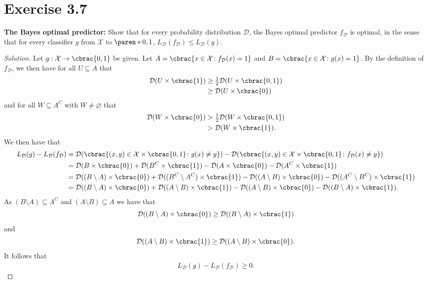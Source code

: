 \documentclass[10pt, a4paper, twoside]{amsart}
\DeclarePairedDelimiter\cbrac\{\}
\DeclarePairedDelimiter\paren()
\renewcommand{\c}{\ensuremath{\colon}}
\newcommand{\se}{\ensuremath{\subseteq}}
\newenvironment{solution}
               {\let\oldqedsymbol=\qedsymbol
                \renewcommand{\qedsymbol}{$\blacktriangleleft$}
                \begin{proof}[Solution]}
               {\end{proof}
                \renewcommand{\qedsymbol}{\oldqedsymbol}}
\begin{document}
\section*{Exercise 3.7}
\textbf{The Bayes optimal predictor:} Show that for every probability distribution $\mathcal{D}$, the Bayes optimal predictor $f_{\mathcal{D}}$ is optimal, in the sense that for every classifier $g$ from $\mathcal{X}$ to $\paren*{0,1}$, $L_{\mathcal{D}}(f_{\mathcal{D}}) \leq L_{\mathcal{D}}(g)$.
\begin{solution}
Let $g:\mathcal{X} \to \cbrac{0,1}$ be given.
Let $A=\cbrac{x \in \mathcal{X} \c f_{\mathcal{D}}(x)=1}$ and $B=\cbrac{x \in \mathcal{X} \c g(x)=1}$.
By the definition of $f_{\mathcal{D}}$, we then have for all $U\se A$ that
\begin{align*}
 \mathcal{D}(U\times\cbrac{1}) & \geq \tfrac{1}{2}\mathcal{D}(U \times \cbrac{0,1}) \\
 & \geq \mathcal{D}(U\times\cbrac{0})
\end{align*}
and for all $W \se A^C$ with $W \neq \varnothing$ that
\begin{align*}
 \mathcal{D}(W\times\cbrac{0}) &> \tfrac{1}{2}\mathcal{D}(W \times \cbrac{0,1}) \\
 &> \mathcal{D}(W\times\cbrac{1}).
\end{align*}
We then have that
\begin{align*}
 L_{\mathcal{D}}(g)-L_{\mathcal{D}}(f_{\mathcal{D}}) &=
 \mathcal{D}(\cbrac{(x,y)\in \mathcal{X}\times\cbrac{0,1} \c g(x)\neq y})- 
 \mathcal{D}(\cbrac{(x,y)\in \mathcal{X}\times\cbrac{0,1} \c f_{\mathcal{D}}(x)\neq y}) \\
 &= \mathcal{D}(B\times\cbrac{0})+\mathcal{D}(B^C\times\cbrac{1}) - 
 \mathcal{D}(A\times\cbrac{0})-\mathcal{D}(A^C\times\cbrac{1}) \\
 &=  \mathcal{D}((B\setminus A)\times\cbrac{0})+ \mathcal{D}((B^C\setminus A^C)\times\cbrac{1})
- \mathcal{D}((A\setminus B)\times\cbrac{0})- \mathcal{D}((A^C\setminus B^C)\times\cbrac{1}) \\
&=  \mathcal{D}((B\setminus A)\times\cbrac{0})+ \mathcal{D}((A\setminus B)\times\cbrac{1})
- \mathcal{D}((A\setminus B)\times\cbrac{0})- \mathcal{D}((B\setminus A)\times\cbrac{1}).
\end{align*}
As $(B\setminus A) \se A^C$ and $(A\setminus B) \se A$ we have that
\begin{equation*}
\mathcal{D}((B\setminus A)\times\cbrac{0}) \geq \mathcal{D}((B\setminus A)\times\cbrac{1})  
\end{equation*}
and 
\begin{equation*}
\mathcal{D}((A\setminus B)\times\cbrac{1}) \geq \mathcal{D}((A\setminus B)\times\cbrac{0}).  
\end{equation*}
It follows that
\begin{align*}
 L_{\mathcal{D}}(g)-L_{\mathcal{D}}(f_{\mathcal{D}}) \geq 0.
\end{align*}
\end{solution}
\end{document}
